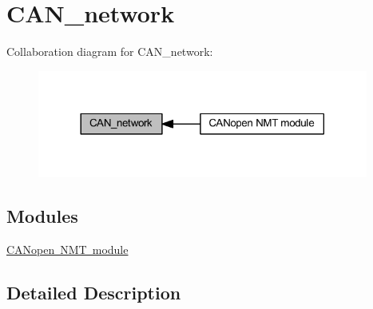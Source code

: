 \hypertarget{group___c_a_n__network}{}\section{C\+A\+N\+\_\+network}
\label{group___c_a_n__network}
Collaboration diagram for C\+A\+N\+\_\+network\+:
\nopagebreak
\begin{figure}[H]
\begin{center}
\leavevmode
\includegraphics[width=308pt]{group___c_a_n__network}
\end{center}
\end{figure}
\subsection*{Modules}
\begin{DoxyCompactItemize}
\item 
\mbox{\hyperlink{group___c_a_nopen___n_m_t__group}{C\+A\+Nopen N\+M\+T module}}
\end{DoxyCompactItemize}


\subsection{Detailed Description}
